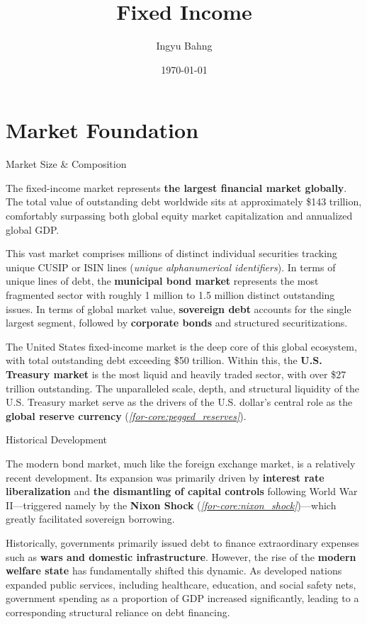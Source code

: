 \documentclass[10pt]{article}
\title{Fixed Income}
\date{\today}
\author{Ingyu Bahng}
\begin{document}


\section{Market Foundation}

  \begin{core}{Market Size \& Composition}

    The fixed-income market represents \textbf{the largest financial market globally}. The total value of outstanding debt worldwide sits at approximately \$143 trillion, comfortably surpassing both global equity market capitalization and annualized global GDP.

    This vast market comprises millions of distinct individual securities tracking unique CUSIP or ISIN lines (\textit{unique alphanumerical identifiers}). In terms of unique lines of debt, the \textbf{municipal bond market} represents the most fragmented sector with roughly 1 million to 1.5 million distinct outstanding issues. In terms of global market value, \textbf{sovereign debt} accounts for the single largest segment, followed by \textbf{corporate bonds} and structured securitizations. 

    The United States fixed-income market is the deep core of this global ecosystem, with total outstanding debt exceeding \$50 trillion. Within this, the \textbf{U.S. Treasury market} is the most liquid and heavily traded sector, with over \$27 trillion outstanding. The unparalleled scale, depth, and structural liquidity of the U.S. Treasury market serve as the drivers of the U.S. dollar's central role as the \textbf{global reserve currency} (\textit{\autoref{for-core:pegged_reserves}}).

  \end{core}

  \begin{core}{Historical Development}

    The modern bond market, much like the foreign exchange market, is a relatively recent development. Its expansion was primarily driven by \textbf{interest rate liberalization} and \textbf{the dismantling of capital controls} following World War II---triggered namely by the \textbf{Nixon Shock} (\textit{\autoref{for-core:nixon_shock}})---which greatly facilitated sovereign borrowing.

    Historically, governments primarily issued debt to finance extraordinary expenses such as \textbf{wars and domestic infrastructure}. However, the rise of the \textbf{modern welfare state} has fundamentally shifted this dynamic. As developed nations expanded public services, including healthcare, education, and social safety nets, government spending as a proportion of GDP increased significantly, leading to a corresponding structural reliance on debt financing.

  \end{core}
\end{document}
